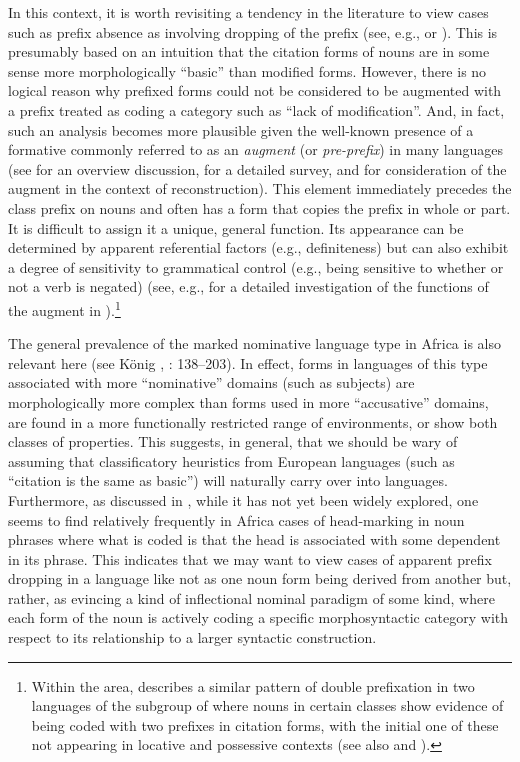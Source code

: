 \documentclass[output=paper ,collection	  ,collectionchapter ,biblatexbackend=biber   ]{langscibook}
\begin{document}
\newpage 
In this context, it is worth revisiting a tendency in the literature to view
cases such as  prefix absence as involving dropping of the prefix
(see, e.g.,  or ). This is
presumably based on an intuition that the citation forms of nouns are in some
sense more morphologically ``basic'' than modified forms. However, there is no
logical reason why prefixed forms could not be considered to be augmented 
with a prefix treated as coding a category such as ``lack of modification''.
And, in fact, such an analysis becomes more plausible given the well-known
presence of a formative commonly referred to as an \emph{augment} (or
\emph{pre-prefix}) in many  languages (see
 for an overview discussion,
 for a detailed survey, and 
for consideration of the augment in the context of  reconstruction).
This element immediately precedes the class prefix on nouns and often has a form
that copies the prefix in whole or part. It is difficult to assign it a
unique, general function. Its appearance can be determined by apparent
referential factors (e.g., definiteness) but can also exhibit a degree of
sensitivity to grammatical control (e.g., being sensitive to whether or not a
verb is negated) (see, e.g.,  for a detailed
investigation of the functions of the augment in ).{\footnote{Within the
 area,  describes a similar
pattern of double prefixation in two languages of the  subgroup of
 where nouns in certain classes show evidence of being coded
with two prefixes in citation forms, with the initial one of these not appearing
in locative and possessive contexts (see also 
and ).}}

The general prevalence of the marked nominative language type in Africa is also
relevant here (see K\"onig \citeyear{Konig2006},
\citeyear{Konig2008}: 138--203). In effect, forms in languages of this type
associated with more ``nominative'' domains (such as subjects) are
morphologically more complex than forms used in more ``accusative'' domains, are
found in a more functionally restricted range of environments, or show both
classes of properties. This suggests, in general, that we should be wary of
assuming that classificatory heuristics from European languages (such as
``citation is the same as basic'') will naturally carry over into  languages. Furthermore, as discussed in
, while it has not yet been widely explored, one
seems to find relatively frequently in Africa cases of head-marking in noun
phrases where what is coded is that the head is associated with some dependent
in its phrase. This indicates that we may want to view cases of apparent prefix
dropping in a language like  not as one noun form being derived from
another but, rather, as evincing a kind of inflectional nominal paradigm of some
kind, where each form of the noun is actively coding a specific morphosyntactic
category with respect to its relationship to a larger syntactic construction.
\end{document}
